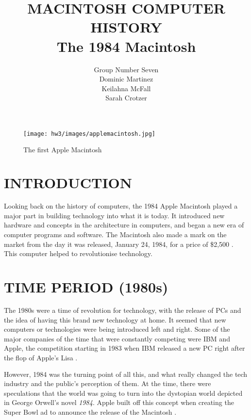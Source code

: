 \documentclass[letterpaper, 10 pt, conference]{IEEEconf}
\title{\LARGE \bf
MACINTOSH COMPUTER HISTORY\\
\large The 1984 Macintosh
}
\author{Group Number Seven\\
\small Dominic Martinez\\
\small Keilahna McFall\\
\small Sarah Crotzer\\
}
\begin{document}
\maketitle
\thispagestyle{empty}
\pagestyle{empty}

\begin{figure}[h!]
\centering
\texttt{[image: hw3/images/applemacintosh.jpg]}
\caption{The first Apple Macintosh \cite{HelloMacPic}}
\label{fig:example}
\end{figure}


\section{INTRODUCTION}

Looking back on the history of computers, the 1984 Apple Macintosh played a major part in building technology into what it is today. It introduced new hardware and concepts in the architecture in computers, and began a new era of computer programs and software. The Macintosh also made a mark on the market from the day it was released, January 24, 1984, for a price of  \$2,500 \cite{HelloMacPic}. This computer helped to revolutionise technology.


\section{TIME PERIOD (1980s)}

The 1980s were a time of revolution for technology, with the release of PCs and the idea of having this brand new technology at home. It seemed that new computers or technologies were being introduced left and right. Some of the major companies of the time that were constantly competing were IBM and Apple, the competition starting in 1983 when IBM released a new PC right after the flop of Apple's Lisa \cite{MacHistory}. 

However, 1984 was the turning point of all this, and what really changed the tech industry and the public's perception of them. At the time, there were speculations that the world was going to turn into the dystopian world depicted in George Orwell's novel \textit{1984}. Apple built off this concept when creating the Super Bowl ad to announce the release of the Macintosh \cite{HelloMacPic}.
\end{document}
